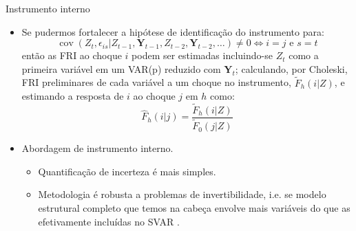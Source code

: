 \documentclass[11pt]{beamer}
\begin{document}
\begin{frame}{Instrumento interno}
\begin{itemize}
		\item Se pudermos fortalecer a hipótese de identificação do instrumento para:
	$$\operatorname{cov}(Z_t, \epsilon_{is}|Z_{t-1},\boldsymbol{Y}_{t-1}, Z_{t-2},\boldsymbol{Y}_{t-2},\ldots)  \neq 0 \iff  i =j \text{ e } s = t$$
	então as FRI ao choque $i$ podem ser estimadas incluindo-se $Z_t$ como a {\color{blue}primeira variável} em um VAR(p) reduzido com $\boldsymbol{Y}_t$; calculando, por Choleski, FRI {\color{blue}preliminares} de cada variável a um choque no instrumento, $\tilde{F}_{h}(i|Z)$, e estimando a resposta de $i$ ao choque $j$ em $h$ como:
	$$\hat F_{h}(i|j) = \frac{\tilde{F}_{h}(i|Z)}{\tilde{F}_{0}(j|Z)}  $$
	\item Abordagem de {\color{blue}instrumento interno}.
	\begin{itemize}
		\item Quantificação de incerteza é mais simples.
		\item Metodologia é robusta a problemas de {\color{blue}invertibilidade}, i.e. se modelo estrutural completo que temos na cabeça envolve mais variáveis do que as efetivamente incluídas no SVAR \citep{plagborg2021}.
	\end{itemize}
\end{itemize}
\end{frame}
\end{document}
